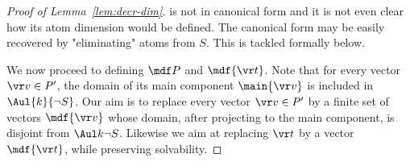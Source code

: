 \begin{proof}[Proof of Lemma~\ref{lem:decr-dim}]
is not in canonical form and it is not even clear how its atom dimension would be defined.
The canonical form may be easily recovered by "eliminating" atoms from $S$.
This is tackled formally below.

We now proceed to defining $\mdf P$ %
and $\mdf{\vr t}$.
Note that for every vector $\vr v \in P'$, the domain of its main component $\main{\vr v}$ is included in $\Aul {k} {\neg S}$.
Our aim is to replace every vector $\vr v \in P'$ by a finite set of vectors $\mdf {\vr v}$ whose domain,
after projecting to the main component, is disjoint from $\Aul k {\neg S}$.
Likewise we aim at replacing $\vr t$ by a vector $\mdf{\vr t}$, while preserving solvability.


\end{proof}
